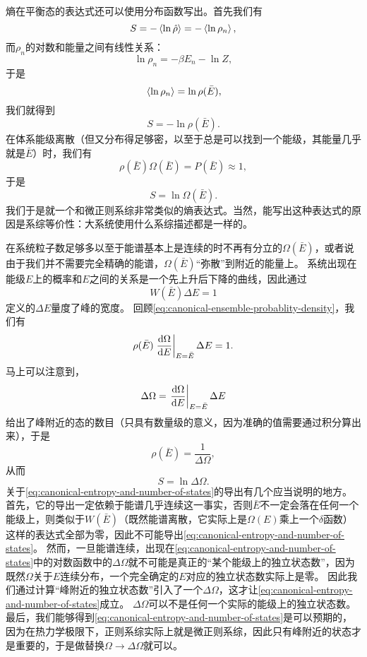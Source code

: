 \documentclass[hyperref, UTF8, a4paper]{ctexart}
\begin{document}
熵在平衡态的表达式还可以使用分布函数写出。首先我们有
\[
    S = - \expval*{\ln \hat{\rho}} = - \expval*{\ln \rho_n},
\]
而$\rho_n$的对数和能量之间有线性关系：
\[
    \ln \rho_n = - \beta E_n - \ln Z,
\]
于是
\[
    \expval*{\ln \rho_n} = \ln \rho(\bar{E}),
\]
我们就得到
\begin{equation}
    S = - \ln \rho(\bar{E}).
\end{equation}
在体系能级离散（但又分布得足够密，以至于总是可以找到一个能级，其能量几乎就是$\bar{E}$）时，我们有
\[
    \rho(\bar{E}) \Omega(\bar{E}) = P(\bar{E}) \approx 1,
\]
于是
\begin{equation}
    S = \ln \Omega(\bar{E}).
\end{equation}
我们于是就一个和微正则系综非常类似的熵表达式。当然，能写出这种表达式的原因是系综等价性：大系统使用什么系综描述都是一样的。

在系统粒子数足够多以至于能谱基本上是连续的时不再有分立的$\Omega(\bar{E})$，或者说由于我们并不需要完全精确的能谱，$\Omega(\bar{E})$“弥散”到附近的能量上。
系统出现在能级$E$上的概率和$E$之间的关系是一个先上升后下降的曲线，因此通过
\begin{equation}
    W(\bar{E}) \Delta E = 1
\end{equation}
定义的$\Delta E$量度了峰的宽度。
回顾\eqref{eq:canonical-ensemble-probablity-density}，我们有
\[
    \rho(\bar{E}) \eval{\dv{\Omega}{E}}_{E=\bar{E}} \Delta E = 1.
\]
马上可以注意到，
\begin{equation}
    \Delta \Omega = \eval{\dv{\Omega}{E}}_{E=\bar{E}} \Delta E
\end{equation}
给出了峰附近的态的数目（只具有数量级的意义，因为准确的值需要通过积分算出来），于是
\[
    \rho(\bar{E}) = \frac{1}{\Delta \Omega},
\]
从而
\begin{equation}
    S = \ln \Delta \Omega.
    \label{eq:canonical-entropy-and-number-of-states}
\end{equation}
关于\eqref{eq:canonical-entropy-and-number-of-states}的导出有几个应当说明的地方。首先，它的导出一定依赖于能谱几乎连续这一事实，否则$\bar{E}$不一定会落在任何一个能级上，则类似于$W(\bar{E})$（既然能谱离散，它实际上是$\Omega(E)$乘上一个$\delta$函数）这样的表达式全部为零，因此不可能导出\eqref{eq:canonical-entropy-and-number-of-states}。
然而，一旦能谱连续，出现在\eqref{eq:canonical-entropy-and-number-of-states}中的对数函数中的$\Delta\Omega$就不可能是真正的“某个能级上的独立状态数”，因为既然$\Omega$关于$E$连续分布，一个完全确定的$E$对应的独立状态数实际上是零。
因此我们通过计算“峰附近的独立状态数”引入了一个$\Delta\Omega$，这才让\eqref{eq:canonical-entropy-and-number-of-states}成立。
$\Delta\Omega$可以不是任何一个实际的能级上的独立状态数。
最后，我们能够得到\eqref{eq:canonical-entropy-and-number-of-states}是可以预期的，因为在热力学极限下，正则系综实际上就是微正则系综，因此只有峰附近的状态才是重要的，于是做替换$\Omega\longrightarrow \Delta\Omega$就可以。
\end{document}
